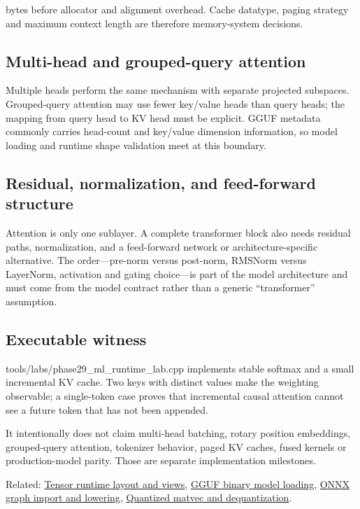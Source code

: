 bytes before allocator and alignment overhead. Cache datatype, paging strategy and maximum context length are therefore memory-system decisions.

\subsection{Multi-head and grouped-query attention}\label{appendix-ea2dadd21ce5-multi-head-and-grouped-query-attention}

\hypertarget{appendix-ea2dadd21ce5-multi-head-and-grouped-query-attention}{}

Multiple heads perform the same mechanism with separate projected subspaces. Grouped-query attention may use fewer key/value heads than query heads; the mapping from query head to KV head must be explicit. GGUF metadata commonly carries head-count and key/value dimension information, so model loading and runtime shape validation meet at this boundary.

\subsection{Residual, normalization, and feed-forward structure}\label{appendix-ea2dadd21ce5-residual-normalization-and-feed-forward-structure}

\hypertarget{appendix-ea2dadd21ce5-residual-normalization-and-feed-forward-structure}{}

Attention is only one sublayer. A complete transformer block also needs residual paths, normalization, and a feed-forward network or architecture-specific alternative. The order---pre-norm versus post-norm, RMSNorm versus LayerNorm, activation and gating choice---is part of the model architecture and must come from the model contract rather than a generic ``transformer'' assumption.

\subsection{Executable witness}\label{appendix-ea2dadd21ce5-executable-witness}

\hypertarget{appendix-ea2dadd21ce5-executable-witness}{}

tools/labs/phase29\_ml\_runtime\_lab.cpp implements stable softmax and a small incremental KV cache. Two keys with distinct values make the weighting observable; a single-token case proves that incremental causal attention cannot see a future token that has not been appended.

It intentionally does not claim multi-head batching, rotary position embeddings, grouped-query attention, tokenizer behavior, paged KV caches, fused kernels or production-model parity. Those are separate implementation milestones.

Related: \hyperref[appendix-cebadf3106d1]{Tensor runtime layout and views}, \hyperref[appendix-fef72dd246f2]{GGUF binary model loading}, \hyperref[appendix-a87217e3af2b]{ONNX graph import and lowering}, \hyperref[appendix-241c0e42ac2d]{Quantized matvec and dequantization}.
